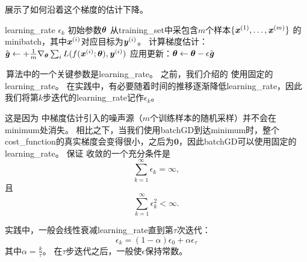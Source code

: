 
展示了如何沿着这个梯度的估计下降。



\begin{algorithm}[ht]
\caption{\gls{SGD}（）在第$k$个训练迭代的更新}
\label{alg:sgd}
\begin{algorithmic}
\REQUIRE \gls{learning_rate} $\epsilon_k$
\REQUIRE 初始参数$\boldsymbol{\theta}$
    \STATE 从\gls{training_set}中采包含$m$个样本$\{ \boldsymbol{\mathit{x}}^{(1)},\dots, \boldsymbol{\mathit{x}}^{(m)}\}$ 的\gls{minibatch}，其中$\boldsymbol{\mathit{x}}^{(i)}$对应目标为$\boldsymbol{\mathit{y}}^{(i)}$。
    \STATE 计算梯度估计： $\hat{\boldsymbol{\mathit{g}}} \leftarrow + 
         \frac{1}{m} \nabla_{\boldsymbol{\theta}} \sum_i L(f(\boldsymbol{\mathit{x}}^{(i)};\boldsymbol{\theta}),\boldsymbol{\mathit{y}}^{(i)})$
    \STATE 应用更新：$\boldsymbol{\theta} \leftarrow \boldsymbol{\theta} - \epsilon \hat{\boldsymbol{\mathit{g}}}$
\ENDWHILE
\end{algorithmic}
\end{algorithm}



\,算法中的一个关键参数是\gls{learning_rate}。
之前，我们介绍的\,\,使用固定的\gls{learning_rate}。
在实践中，有必要随着时间的推移逐渐降低\gls{learning_rate}，因此我们将第$k$步迭代的\gls{learning_rate}记作$\epsilon_k$。


这是因为\,\,中梯度估计引入的噪声源（$m$个训练样本的随机采样）并不会在\gls{minimum}处消失。
相比之下，当我们使用\gls{batch}\gls{GD}到达\gls{minimum}时，整个\gls{cost_function}的真实梯度会变得很小，之后为$\mathbf{0}$，因此\gls{batch}\gls{GD}可以使用固定的\gls{learning_rate}。
保证\,\,收敛的一个充分条件是
\begin{equation}
\label{eq:8.12}
    \sum_{k=1}^\infty \epsilon_k = \infty,
\end{equation}
且
\begin{equation}
\label{eq:8.13}
    \sum_{k=1}^\infty \epsilon_k^2 < \infty.
\end{equation}


实践中，一般会线性衰减\gls{learning_rate}直到第$\tau$次迭代：
\begin{equation}
\label{eq:8.14}
    \epsilon_k = (1-\alpha) \epsilon_0 + \alpha \epsilon_\tau
\end{equation}
其中$\alpha = \frac{k}{\tau}$。
在$\tau$步迭代之后，一般使$\epsilon$保持常数。

